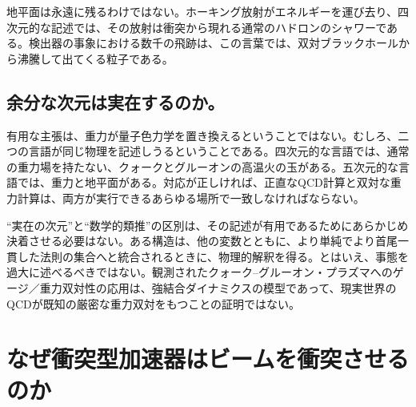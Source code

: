 地平面は永遠に残るわけではない。ホーキング放射がエネルギーを運び去り、四次元的な記述では、その放射は衝突から現れる通常のハドロンのシャワーである。検出器の事象における数千の飛跡は、この言葉では、双対ブラックホールから沸騰して出てくる粒子である。

\subsection{余分な次元は実在するのか。}

\begin{classroomqa}
\end{classroomqa}

有用な主張は、重力が量子色力学を置き換えるということではない。むしろ、二つの言語が同じ物理を記述しうるということである。四次元的な言語では、通常の重力場を持たない、クォークとグルーオンの高温火の玉がある。五次元的な言語では、重力と地平面がある。対応が正しければ、正直なQCD計算と双対な重力計算は、両方が実行できるあらゆる場所で一致しなければならない。

\begin{classroomqa}
\end{classroomqa}

``実在の次元''と``数学的類推''の区別は、その記述が有用であるためにあらかじめ決着させる必要はない。ある構造は、他の変数とともに、より単純でより首尾一貫した法則の集合へと統合されるときに、物理的解釈を得る。とはいえ、事態を過大に述べるべきではない。観測されたクォーク--グルーオン・プラズマへのゲージ／重力双対性の応用は、強結合ダイナミクスの模型であって、現実世界のQCDが既知の厳密な重力双対をもつことの証明ではない。

\section{なぜ衝突型加速器はビームを衝突させるのか}

